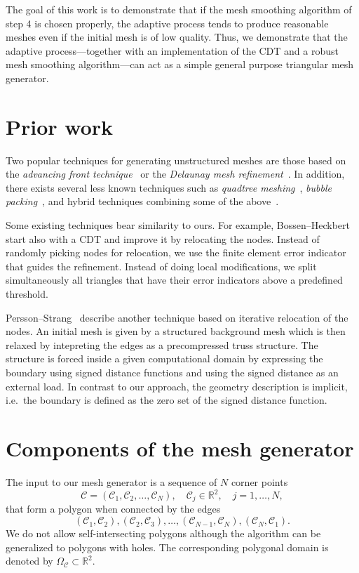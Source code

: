 \documentclass[11pt]{article}
\begin{document}
The goal of this work is to demonstrate that if the mesh smoothing algorithm of
step 4 is chosen properly, the adaptive process tends to produce reasonable
meshes even if the initial mesh is of low quality.  Thus, we demonstrate that
the adaptive process---together with an implementation of the CDT and a robust
mesh smoothing algorithm---can act as a simple general purpose triangular mesh
generator.

\section{Prior work}
\label{sec:org7798f6d}

Two popular techniques for generating unstructured meshes are those based on the
\emph{advancing front technique}~\cite{L_hner_1988} or the \emph{Delaunay mesh
refinement}~\cite{Chew_1989, Ruppert_1995, Shewchuk_2002}.  In addition, there
exists several less known techniques such as \emph{quadtree
meshing}~\cite{Yerry_1983}, \emph{bubble packing}~\cite{Shimada_1995}, and
hybrid techniques combining some of the above~\cite{mavriplis1995advancing}.

Some existing techniques bear similarity to ours.  For example,
Bossen--Heckbert~\cite{bossen1996pliant} start also with a CDT and improve it by
relocating the nodes.  Instead of randomly picking nodes for relocation, we use
the finite element error indicator that guides the refinement.  Instead of doing
local modifications, we split simultaneously all triangles that have their error indicators
above a predefined threshold.

Persson--Strang~\cite{persson2004simple} describe another technique based on
iterative relocation of the nodes.  An initial mesh is given by a structured
background mesh which is then relaxed by intepreting the edges as a
precompressed truss structure.  The structure is forced inside a given
computational domain by expressing the boundary using signed distance functions
and using the signed distance as an external load.  In contrast to our approach,
the geometry description is implicit, i.e.~the boundary is defined as the zero
set of the signed distance function.

\section{Components of the mesh generator}
\label{sec:components}

The input to
our mesh generator is a sequence of \(N\) corner points
$$\mathcal{C} = (\mathcal{C}_1, \mathcal{C}_2, \dots, \mathcal{C}_N), \quad \mathcal{C}_j \in \mathbb{R}^2, \quad j = 1,\dots,N,$$
that form a polygon when connected by the edges
$$(\mathcal{C}_1, \mathcal{C}_2), (\mathcal{C}_2,\mathcal{C}_3),
\dots, (\mathcal{C}_{N-1}, \mathcal{C}_N), (\mathcal{C}_N,\mathcal{C}_1).$$
We do not allow self-intersecting polygons although
the algorithm can be generalized to polygons
with holes.
The corresponding polygonal domain is denoted
by \(\Omega_{\mathcal{C}} \subset \mathbb{R}^2\).
\end{document}
